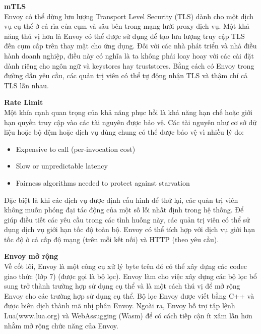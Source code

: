 \documentclass[12pt,a4paper]{report}
\begin{document}
		\textbf{mTLS}\\
		Envoy có thể dừng lưu lượng Transport Level Security (TLS) dành cho một dịch vụ cụ thể ở cả rìa của cụm và sâu bên trong mạng lưới proxy dịch vụ. Một khả năng thú vị hơn là Envoy có thể được sử dụng để tạo lưu lượng truy cập TLS đến cụm cấp trên thay mặt cho ứng dụng. Đối với các nhà phát triển và nhà điều hành doanh nghiệp, điều này có nghĩa là ta không phải loay hoay với các cài đặt dành riêng cho ngôn ngữ và keystores hay truststores. Bằng cách có Envoy trong đường dẫn yêu cầu, các quản trị viên có thể tự động nhận TLS và thậm chí cả TLS lẫn nhau.
		
		\textbf{Rate Limit}\\
		Một khía cạnh quan trọng của khả năng phục hồi là khả năng hạn chế hoặc giới hạn quyền truy cập vào các tài nguyên được bảo vệ. Các tài nguyên như cơ sở dữ liệu hoặc bộ đệm hoặc dịch vụ dùng chung có thể được bảo vệ vì nhiều lý do:
		\begin{itemize}
			\item Expensive to call (per-invocation cost)
			\item Slow or unpredictable latency
			\item Fairness algorithms needed to protect against starvation
		\end{itemize}
		
		Đặc biệt là khi các dịch vụ được định cấu hình để thử lại, các quản trị viên không muốn phóng đại tác động của một số lỗi nhất định trong hệ thống. Để giúp điều tiết các yêu cầu trong các tình huống này, các quản trị viên có thể sử dụng dịch vụ giới hạn tốc độ toàn bộ. Envoy có thể tích hợp với dịch vụ giới hạn tốc độ ở cả cấp độ mạng (trên mỗi kết nối) và HTTP (theo yêu cầu).
		
		\textbf{Envoy mở rộng}\\
		Về cốt lõi, Envoy là một công cụ xử lý byte trên đó có thể xây dựng các codec giao thức (lớp 7) (được gọi là bộ lọc). Envoy làm cho việc xây dựng các bộ lọc bổ sung trở thành trường hợp sử dụng cụ thể và là một cách thú vị để mở rộng Envoy cho các trường hợp sử dụng cụ thể. Bộ lọc Envoy được viết bằng C++ và được biên dịch thành mã nhị phân Envoy. Ngoài ra, Envoy hỗ trợ tập lệnh Lua(www.lua.org) và WebAssugging (Wasm) để có cách tiếp cận ít xâm lấn hơn nhằm mở rộng chức năng của Envoy.
		
\end{document}
